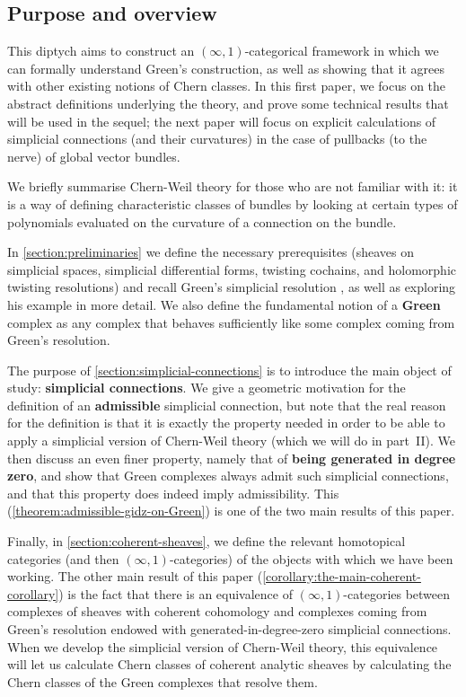 \documentclass[11pt,fleqn]{article}
\theoremstyle{plain}
\theoremstyle{definition}
\theoremstyle{remark}
\numberwithin{equation}{theorem}
\newcommand{\define}[1]{\textbf{#1}}
\begin{document}
    \subsection{Purpose and overview}

    This diptych aims to construct an $(\infty,1)$-categorical framework in which we can formally understand Green's construction, as well as showing that it agrees with other existing notions of Chern classes.
    In this first paper, we focus on the abstract definitions underlying the theory, and prove some technical results that will be used in the sequel; the next paper will focus on explicit calculations of simplicial connections (and their curvatures) in the case of pullbacks (to the nerve) of global vector bundles.

    We briefly summarise Chern-Weil theory for those who are not familiar with it: it is a way of defining characteristic classes of bundles by looking at certain types of polynomials evaluated on the curvature of a connection on the bundle.

    \medskip

    In \cref{section:preliminaries} we define the necessary prerequisites (sheaves on simplicial spaces, simplicial differential forms, twisting cochains, and holomorphic twisting resolutions) and recall Green's simplicial resolution \cite[§1.4]{Green1980}, as well as exploring his example \cite[pp.~41-42]{Green1980} in more detail.
    We also define the fundamental notion of a \define{Gre{}en} complex as any complex that behaves sufficiently like some complex coming from Green's resolution.

    The purpose of \cref{section:simplicial-connections} is to introduce the main object of study: \define{simplicial connections}.
    We give a geometric motivation for the definition of an \define{admissible} simplicial connection, but note that the real reason for the definition is that it is exactly the property needed in order to be able to apply a simplicial version of Chern-Weil theory (which we will do in part~II).
    We then discuss an even finer property, namely that of \define{being generated in degree zero}, and show that Gre{}en complexes always admit such simplicial connections, and that this property does indeed imply admissibility.
    This (\cref{theorem:admissible-gidz-on-Green}) is one of the two main results of this paper.

    Finally, in \cref{section:coherent-sheaves}, we define the relevant homotopical categories (and then $(\infty,1)$-categories) of the objects with which we have been working.
    The other main result of this paper (\cref{corollary:the-main-coherent-corollary}) is the fact that there is an equivalence of $(\infty,1)$-categories between complexes of sheaves with coherent cohomology and complexes coming from Green's resolution endowed with generated-in-degree-zero simplicial connections.
    When we develop the simplicial version of Chern-Weil theory, this equivalence will let us calculate Chern classes of coherent analytic sheaves by calculating the Chern classes of the Gre{}en complexes that resolve them.
\end{document}
